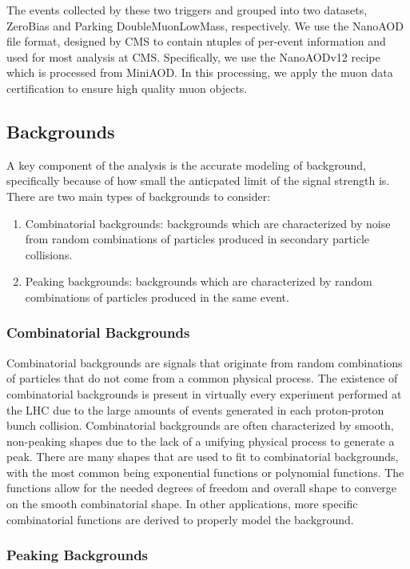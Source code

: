 The events collected by these two triggers and grouped into two datasets, ZeroBias and Parking DoubleMuonLowMass, respectively. We use the NanoAOD file format, designed by CMS to contain ntuples of per-event information and used for most analysis at CMS. Specifically, we use the NanoAODv12 recipe which is processed from MiniAOD. In this processing, we apply the muon data certification to ensure high quality muon objects. 

\subsection{Backgrounds}
\label{subsec:backgrounds}

A key component of the analysis is the accurate modeling of background, specifically because of how small the anticpated limit of the signal strength is. There are two main types of backgrounds to consider: 
\begin{enumerate}
    \item Combinatorial backgrounds: backgrounds which are characterized by noise from random combinations of particles produced in secondary particle collisions. 
    \item Peaking backgrounds: backgrounds which are characterized by random combinations of particles produced in the same event.
\end{enumerate}

\subsubsection{Combinatorial Backgrounds}

Combinatorial backgrounds are signals that originate from random combinations of particles that do not come from a common physical process. The existence of combinatorial backgrounds is present in virtually every experiment performed at the LHC due to the large amounts of events generated in each proton-proton bunch collision. Combinatorial backgrounds are often characterized by smooth, non-peaking shapes due to the lack of a unifying physical process to generate a peak. There are many shapes that are used to fit to combinatorial backgrounds, with the most common being exponential functions or polynomial functions. The functions allow for the needed degrees of freedom and overall shape to converge on the smooth combinatorial shape. In other applications, more specific combinatorial functions are derived to properly model the background. 

\subsubsection{Peaking Backgrounds}

